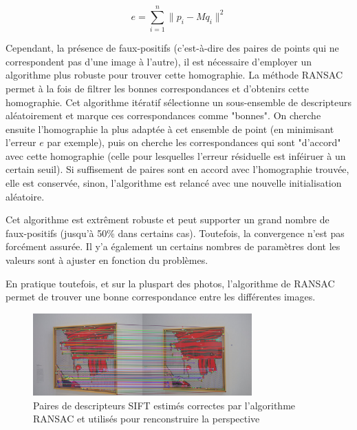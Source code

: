\documentclass[12pt,a4paper]{article}
\begin{document}
$$ e = \sum_{i = 1}^{n}\|p_i - Mq_i\|^2$$

Cependant, la présence de faux-positifs (c'est-à-dire des paires de points qui ne correspondent pas d'une image à l'autre), il est nécessaire d'employer un algorithme plus robuste pour trouver cette homographie. La méthode RANSAC~\citep{fischler1981random} permet à la fois de filtrer les bonnes correspondances et d'obtenirs cette homographie. Cet algorithme itératif sélectionne un sous-ensemble de descripteurs aléatoirement et marque ces correspondances comme "bonnes". On cherche ensuite l'homographie la plus adaptée à cet ensemble de point (en minimisant l'erreur $e$ par exemple), puis on cherche les correspondances qui sont "d'accord" avec cette homographie (celle pour lesquelles l'erreur résiduelle est inféiruer à un certain seuil). Si suffisement de paires sont en accord avec l'homographie trouvée, elle est conservée, sinon, l'algorithme est relancé avec une nouvelle initialisation aléatoire.

Cet algorithme est extrêment robuste et peut supporter un grand nombre de faux-positifs (jusqu'à 50\% dans certains cas). Toutefois, la convergence n'est pas forcément assurée. Il y'a également un certains nombres de paramètres dont les valeurs sont à ajuster en fonction du problèmes.

En pratique toutefois, et sur la pluspart des photos, l'algorithme de RANSAC permet de trouver une bonne correspondance entre les différentes images. 

\begin{figure}[H]
  \centering
  \includegraphics[width=0.75\textwidth]{Fig/sift_ransac.png}
  \caption{Paires de descripteurs SIFT estimés correctes par l'algorithme RANSAC et utilisés pour renconstruire la perspective}
\end{figure}
\end{document}
